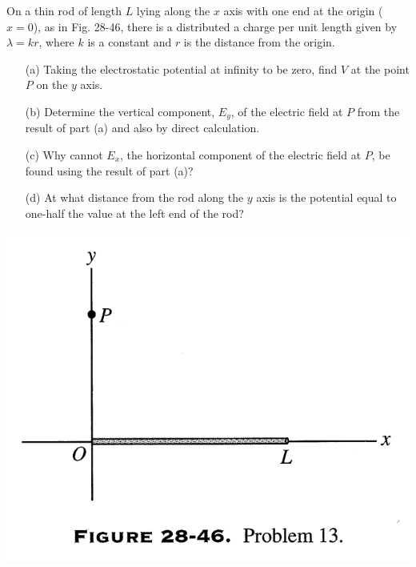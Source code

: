 \documentclass[12pt,letterpaper,boxed,cm]{hmcpset}
\begin{document}
\begin{problem}[28-P13]
On a thin rod of length $L$ lying along the $x$ axis with one end at the origin ($x = 0$), as in Fig. 28-46, there is a distributed a charge per unit length given by $\lambda = kr$, where $k$ is a constant and $r$ is the distance from the origin.
\begin{enumerate}
	\item[(a)] Taking the electrostatic potential at infinity to be zero, find $V$ at the point $P$ on the $y$ axis.
	\item[(b)] Determine the vertical component, $E_y$, of the electric field at $P$ from the result of part (a) and also by direct calculation.
	\item[(c)] Why cannot $E_x$, the horizontal component of the electric field at $P$, be found using the result of part (a)?
	\item[(d)] At what distance from the rod along the $y$ axis is the potential equal to one-half the value at the left end of the rod?
\end{enumerate}	
\begin{center}
	\includegraphics[scale=0.7]{03.png}
\end{center}
\end{problem}
\begin{solution}
\end{solution}
\newpage
\end{document}
